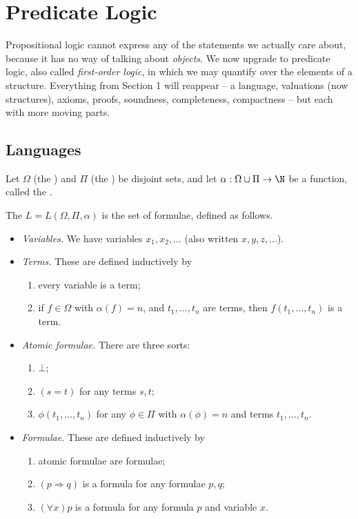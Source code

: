 \section{Predicate Logic}\label{sec:predicate}

Propositional logic cannot express any of the statements we actually care about, because it has no way of talking about \emph{objects}. We now upgrade to predicate logic, also called \emph{first-order logic}, in which we may quantify over the elements of a structure. Everything from Section 1 will reappear -- a language, valuations (now structures), axioms, proofs, soundness, completeness, compactness -- but each with more moving parts.

\subsection{Languages}

\begin{definition}[Language]
  Let $\Omega$ (the ) and $\Pi$ (the ) be disjoint sets, and let $\alpha: \Omega \cup \Pi \rightarrow \N$ be a function, called the .

  The  $L = L(\Omega, \Pi, \alpha)$ is the set of formulae, defined as follows.
  \begin{itemize}
    \item \emph{Variables.} We have variables $x_1, x_2, \dots$ (also written $x, y, z, \dots$).
    \item \emph{Terms.} These are defined inductively by
    \begin{enumerate}[label=(\roman*)]
      \item every variable is a term;
      \item if $f \in \Omega$ with $\alpha(f) = n$, and $t_1, \dots, t_n$ are terms, then $f(t_1, \dots, t_n)$ is a term.
    \end{enumerate}
    \item \emph{Atomic formulae.} There are three sorts:
    \begin{enumerate}[label=(\roman*)]
      \item $\bot$;
      \item $(s = t)$ for any terms $s, t$;
      \item $\phi(t_1, \dots, t_n)$ for any $\phi \in \Pi$ with $\alpha(\phi) = n$ and terms $t_1, \dots, t_n$.
    \end{enumerate}
    \item \emph{Formulae.} These are defined inductively by
    \begin{enumerate}[label=(\roman*)]
      \item atomic formulae are formulae;
      \item $(p \Rightarrow q)$ is a formula for any formulae $p, q$;
      \item $(\forall x) p$ is a formula for any formula $p$ and variable $x$.
    \end{enumerate}
  \end{itemize}
\end{definition}

